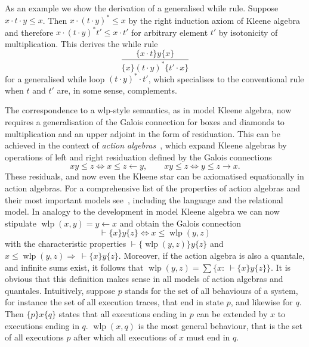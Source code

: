 \documentclass{llncs}
\DeclareMathOperator{\wlp}{wlp}
\begin{document}
As an example we show the derivation of a generalised while
rule. Suppose $x\cdot t\cdot y\le x$. Then $x\cdot (t\cdot y)^\ast \le
x$ by the right induction axiom of Kleene algebra and therefore
$x\cdot (t\cdot y)^\ast t'\le x\cdot t'$ for arbitrary element $t'$ by
isotonicity of multiplication. This derives the while rule
\begin{equation*}
  \frac{\{x\cdot t\}y\{x\}}{\{x\}(t\cdot y)^\ast\{t'\cdot x\}}
\end{equation*}
for a generalised while loop $(t\cdot y)^\ast\cdot t'$, which
specialises to the conventional rule when $t$ and $t'$ are, in some
sense, complements.

The correspondence to a wlp-style semantics, as in model Kleene
algebra, now requires a generalisation of the Galois connection for
boxes and diamonds to multiplication and an upper adjoint in the form
of residuation.  This can be achieved in the context of \emph{action
  algebras}~\cite{pratt}, which expand Kleene algebras by operations
of left and right residuation defined by the Galois connections
\begin{equation*}
  xy\le z\Leftrightarrow x\le z\leftarrow y,\qquad xy\le z \Leftrightarrow y\le z\rightarrow x.
\end{equation*}
 These
residuals, and now even the Kleene star can be axiomatised
equationally in action algebras. For a comprehensive list of the
properties of action algebras and their most important models
see~\cite{archive}, including the language and the relational
model. In analogy to the development in model Kleene algebra we can
now stipulate $ \wlp(x,y)=y\leftarrow x$ and obtain the Galois
connection
\begin{equation*}
  \vdash \{x\}y\{z\} \Leftrightarrow x\le \wlp(y,z)
\end{equation*}
with the characteristic properties $\vdash \{\wlp(y,z)\}y\{z\}$ and $x\le
\wlp(y,z)\Rightarrow \ \vdash \{x\}y\{z\}$. Moreover, if the action algebra is
also a quantale, and infinite sums exist, it follows that $
\wlp(y,z)=\sum\{x:\ \vdash \{x\}y\{z\}\}$.  It is obvious that this definition
makes sense in all models of action algebras and
quantales. Intuitively, suppose $p$ stands for the set of all
behaviours of a system, for instance the set of all execution traces,
that end in state $p$, and likewise for $q$. Then $\{p\}x\{q\}$ states
that all executions ending in $p$ can be extended by $x$ to executions
ending in $q$. $\wlp(x,q)$ is the most general behaviour, that is the
set of all executions $p$ after which all executions of $x$ must end
in $q$.
\end{document}
